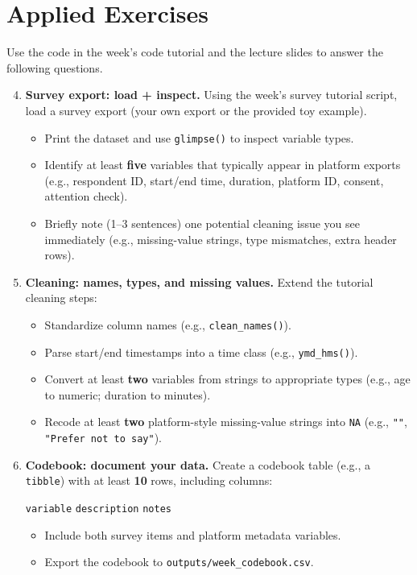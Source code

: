 \documentclass[11pt]{article}
\begin{document}
\section*{Applied Exercises}
Use the code in the week's code tutorial and the lecture slides to answer the following questions.\bigskip

  \begin{enumerate}
\setcounter{enumi}{3}

\item \textbf{Survey export: load + inspect.}
Using the week's survey tutorial script, load a survey export (your own export or the provided toy example).
\begin{itemize}
  \item Print the dataset and use \texttt{glimpse()} to inspect variable types.
  \item Identify at least \textbf{five} variables that typically appear in platform exports (e.g., respondent ID, start/end time, duration, platform ID, consent, attention check).
  \item Briefly note (1--3 sentences) one potential cleaning issue you see immediately (e.g., missing-value strings, type mismatches, extra header rows).
\end{itemize}

\item \textbf{Cleaning: names, types, and missing values.}
Extend the tutorial cleaning steps:
\begin{itemize}
  \item Standardize column names (e.g., \texttt{clean\_names()}).
  \item Parse start/end timestamps into a time class (e.g., \texttt{ymd\_hms()}).
  \item Convert at least \textbf{two} variables from strings to appropriate types (e.g., age to numeric; duration to minutes).
  \item Recode at least \textbf{two} platform-style missing-value strings into \texttt{NA} (e.g., \texttt{""}, \texttt{"Prefer not to say"}).
\end{itemize}

\item \textbf{Codebook: document your data.}
Create a codebook table (e.g., a \texttt{tibble}) with at least \textbf{10} rows, including columns:
\begin{center}
\texttt{variable} \quad \texttt{description} \quad \texttt{notes}
\end{center}
\begin{itemize}
  \item Include both survey items and platform metadata variables.
  \item Export the codebook to \texttt{outputs/week\_codebook.csv}.
\end{itemize}


\end{enumerate}
\end{document}

